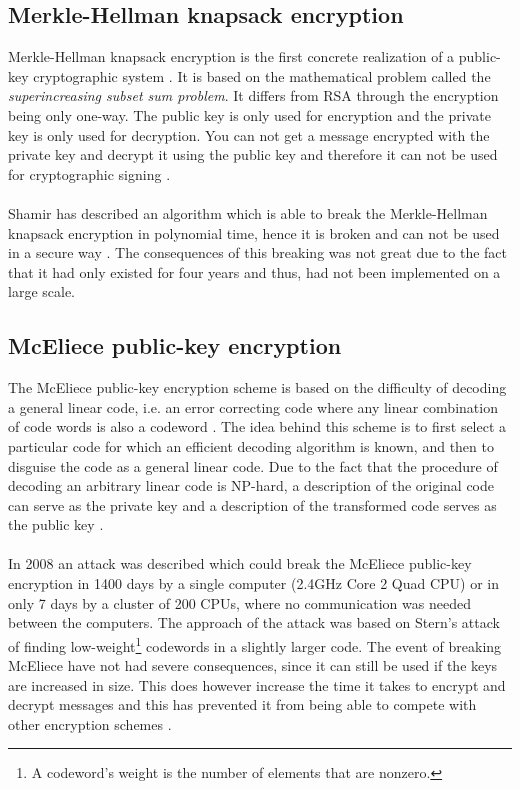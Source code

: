 \documentclass[frame, english]{idamasterthesis}
\begin{document}
\subsection{Merkle-Hellman knapsack encryption}
Merkle-Hellman knapsack encryption is the first concrete realization of a public-key cryptographic system \cite{handcrypt}. It is based on the mathematical problem called the \textit{superincreasing subset sum problem}. It differs from RSA through the encryption being only one-way. The public key is only used for encryption and the private key is only used for decryption. You can not get a message encrypted with the private key and decrypt it using the public key and therefore it can not be used for cryptographic signing \cite{handcrypt}. \\\\
Shamir has described an algorithm which is able to break the Merkle-Hellman knapsack encryption in polynomial time, hence it is broken and can not be used in a secure way \cite{merklebroken}. The consequences of this breaking was not great due to the fact that it had only existed for four years and thus, had not been implemented on a large scale.  

\subsection{McEliece public-key encryption}
The McEliece public-key encryption scheme is based on the difficulty of decoding a general linear code, i.e. an error correcting code where any linear combination of code words is also a codeword \cite{code}. 
The idea behind this scheme is to first select a particular code for which an efficient decoding algorithm is known, and then to disguise the code as a general linear code. Due to the fact that the procedure of decoding an arbitrary linear code is NP-hard, a description of the original code can serve as the private key and a description of the transformed code serves as the public key \cite{handcrypt}.\\\\
In 2008 \cite{attackdefence,analysmce} an attack was described which could break the McEliece public-key encryption in 1400 days by a single computer (2.4GHz Core 2 Quad CPU) or in only 7 days by a cluster of 200 CPUs, where no communication was needed between the computers. The approach of the attack was based on Stern's attack of finding low-weight\footnote{A codeword's weight is the number of elements that are nonzero.} codewords in a slightly larger code. The event of breaking McEliece have not had severe consequences, since it can still be used if the keys are increased in size. This does however increase the time it takes to encrypt and decrypt messages and this has prevented it from being able to compete with other encryption schemes \cite{handcrypt}.  
\end{document}

